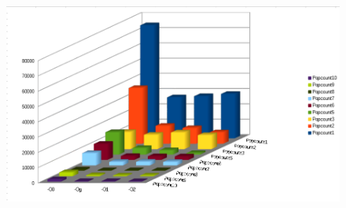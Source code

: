 	\begin{figure}[htb]
		\centering
		\includegraphics[width=1.0\textwidth]{./imagenes/3}
	\end{figure}
	

	


